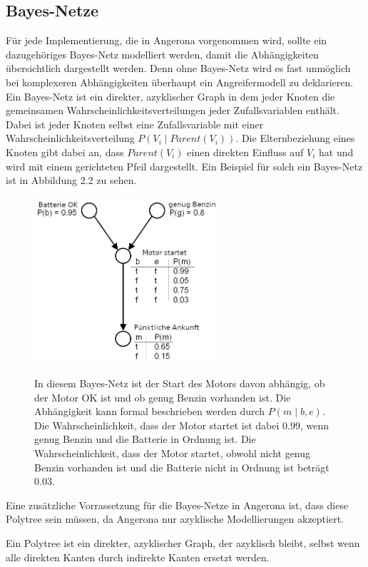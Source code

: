 \documentclass[german,version-2020-11]{uzl-thesis}
\begin{document}
\subsection{Bayes-Netze}
Für jede Implementierung, die in Angerona vorgenommen wird, sollte ein dazugehöriges Bayes-Netz modelliert werden, damit die Abhängigkeiten übersichtlich dargestellt werden. Denn ohne Bayes-Netz  wird es fast unmöglich bei komplexeren Abhängigkeiten überhaupt ein Angreifermodell zu deklarieren.  \\
Ein Bayes-Netz ist ein direkter, azyklischer Graph in dem jeder Knoten die gemeinsamen Wahrscheinlichkeitsverteilungen jeder Zufallsvariablen enthält. Dabei ist jeder Knoten selbst eine Zufallsvariable mit einer Wahrscheinlichkeitsverteilung $P(V_i \mid Parent(V_i) )$. Die Elternbeziehung eines Knoten gibt dabei an, dass $Parent(V_i) $ einen direkten Einfluss auf $V_i$ hat und wird  mit einem gerichteten Pfeil dargestellt\cite{3}. Ein Beispiel für solch ein Bayes-Netz ist in Abbildung 2.2 zu sehen. 
\begin{figure}[ht]
	\centering
	\includegraphics[width=0.6\textwidth]{bayes-netz-bsp.PNG}
	\caption{In diesem Bayes-Netz ist der Start des Motors davon abhängig, ob der Motor OK ist und ob genug Benzin vorhanden ist. Die Abhängigkeit kann formal beschrieben werden durch $P(m \mid b,e)$. Die Wahrscheinlichkeit, dass der Motor startet ist dabei $0.99$, wenn genug Benzin und die Batterie in Ordnung ist. Die Wahrscheinlichkeit, dass der Motor startet, obwohl nicht genug Benzin vorhanden ist und die Batterie nicht in Ordnung ist beträgt $0.03$.}
	\cite{10}
	\label{fig}
\end{figure}
Eine zusätzliche Vorrassetzung für die Bayes-Netze  in Angerona ist, dass diese Polytree sein müssen, da Angerona nur azyklische Modellierungen akzeptiert.
 \begin{definition}[Polytree]
	Ein Polytree ist ein direkter, azyklischer Graph, der azyklisch bleibt, selbst wenn alle direkten Kanten durch indirekte Kanten ersetzt werden.
\end{definition}
\end{document}
